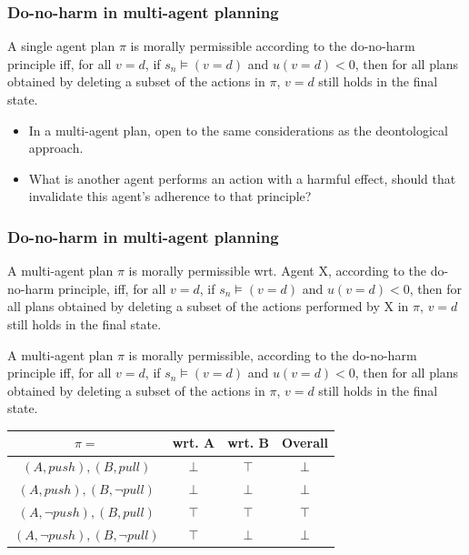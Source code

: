 \documentclass{beamer}
\begin{document}
\begin{frame}
\frametitle{Do-no-harm in multi-agent planning}
\begin{definition}
A single agent plan $\pi$ is morally permissible according to the do-no-harm principle iff, for all $v=d$, if $s_n \models (v=d)$ and $u(v=d)<0$, then for all plans obtained by deleting a subset of the actions in $\pi$, $v=d$ still holds in the final state.
\end{definition}

\begin{itemize}
\item In a multi-agent plan, open to the same considerations as the deontological approach.
\item What is another agent performs an action with a harmful effect, should that invalidate this agent's adherence to that principle?
\end{itemize}


\end{frame}

\begin{frame}
\frametitle{Do-no-harm in multi-agent planning}

\begin{definition}
A multi-agent plan $\pi$ is morally permissible wrt. Agent X, according to the do-no-harm principle, iff, for all $v=d$, if $s_n \models (v=d)$ and $u(v=d)<0$, then for all plans obtained by deleting a subset of the actions performed by X in $\pi$, $v=d$ still holds in the final state.
\end{definition}

\begin{definition}
A multi-agent plan $\pi$ is morally permissible, according to the do-no-harm principle iff, for all $v=d$, if $s_n \models (v=d)$ and $u(v=d)<0$, then for all plans obtained by deleting a subset of the actions in $\pi$, $v=d$ still holds in the final state.
\end{definition}


\begin{center}
\begin{tabular}{ |c|c|c|c| } 
 \hline
 $\pi=$ & wrt. A & wrt. B & Overall \\ 
 \hline
 $(A,push), (B, pull)$& $\bot$ &  $\top$&  $\bot$ \\ 
 \hline
 $(A,push), (B, \lnot pull)$ & $\bot$ & $\bot$ & $\bot$\\ 
 \hline
 $(A,\lnot push), (B, pull)$ & $\top$ & $\top$ & $\top$\\ 
 \hline
 $(A,\lnot push), (B, \lnot pull)$ & $\top$ & $\bot$ & $\bot$\\ 
 \hline
\end{tabular}
\end{center}

\end{frame}
\end{document}
